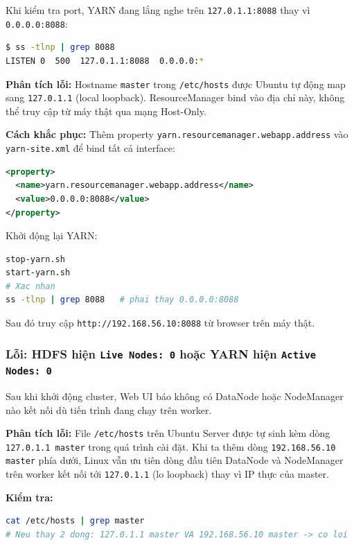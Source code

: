 Khi kiểm tra port, YARN đang lắng nghe trên \texttt{127.0.1.1:8088} thay vì \texttt{0.0.0.0:8088}:

\begin{lstlisting}[language=bash, numbers=none]
$ ss -tlnp | grep 8088
LISTEN 0  500  127.0.1.1:8088  0.0.0.0:*
\end{lstlisting}

\textbf{Phân tích lỗi:} Hostname \texttt{master} trong \texttt{/etc/hosts} được Ubuntu tự động map sang \texttt{127.0.1.1} (local loopback). ResourceManager bind vào địa chỉ này, không thể truy cập từ máy thật qua mạng Host-Only.

\textbf{Cách khắc phục:} Thêm property \texttt{yarn.resourcemanager.webapp.address} vào \texttt{yarn-site.xml} để bind tất cả interface:

\begin{lstlisting}[language=xml, numbers=none]
<property>
  <name>yarn.resourcemanager.webapp.address</name>
  <value>0.0.0.0:8088</value>
</property>
\end{lstlisting}

Khởi động lại YARN:

\begin{lstlisting}[language=bash, numbers=none]
stop-yarn.sh
start-yarn.sh
# Xac nhan
ss -tlnp | grep 8088   # phai thay 0.0.0.0:8088
\end{lstlisting}

Sau đó truy cập \texttt{http://192.168.56.10:8088} từ browser trên máy thật.

\subsubsection{Lỗi: HDFS hiện \texttt{Live Nodes: 0} hoặc YARN hiện \texttt{Active Nodes: 0}}

Sau khi khởi động cluster, Web UI báo không có DataNode hoặc NodeManager nào kết nối dù tiến trình đang chạy trên worker.

\textbf{Phân tích lỗi:} File \texttt{/etc/hosts} trên Ubuntu Server được tự sinh kèm dòng \texttt{127.0.1.1 master} trong quá trình cài đặt. Khi ta thêm dòng \texttt{192.168.56.10 master} phía dưới, Linux vẫn ưu tiên dòng đầu tiên \textemdash DataNode và NodeManager trên worker kết nối tới \texttt{127.0.1.1} (lo loopback) thay vì IP thực của master.

\textbf{Kiểm tra:}

\begin{lstlisting}[language=bash, numbers=none]
cat /etc/hosts | grep master
# Neu thay 2 dong: 127.0.1.1 master VA 192.168.56.10 master -> co loi
\end{lstlisting}

